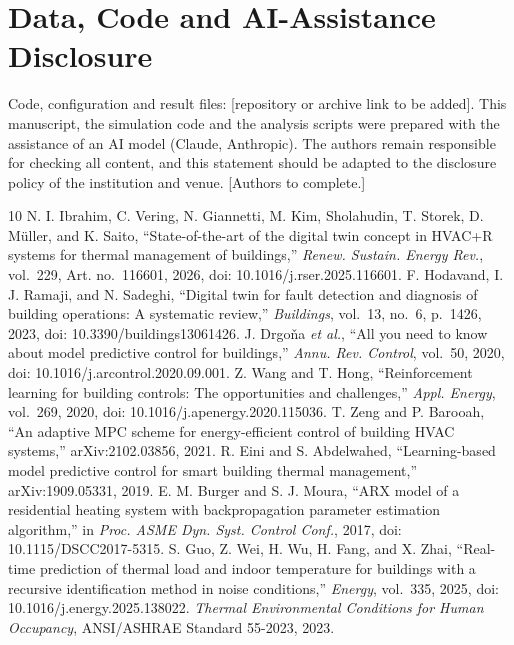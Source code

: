 \documentclass[conference]{IEEEtran}
\begin{document}
\section*{Data, Code and AI-Assistance Disclosure}
Code, configuration and result files: [repository or archive link to be added]. This manuscript, the simulation code and the analysis scripts were prepared with the assistance of an AI model (Claude, Anthropic). The authors remain responsible for checking all content, and this statement should be adapted to the disclosure policy of the institution and venue. [Authors to complete.]

\begin{thebibliography}{10}
 N. I. Ibrahim, C. Vering, N. Giannetti, M. Kim, Sholahudin, T. Storek, D. M\"uller, and K. Saito, ``State-of-the-art of the digital twin concept in HVAC+R systems for thermal management of buildings,'' \emph{Renew. Sustain. Energy Rev.}, vol.~229, Art. no.~116601, 2026, doi: 10.1016/j.rser.2025.116601.
 F. Hodavand, I. J. Ramaji, and N. Sadeghi, ``Digital twin for fault detection and diagnosis of building operations: A systematic review,'' \emph{Buildings}, vol.~13, no.~6, p.~1426, 2023, doi: 10.3390/buildings13061426.
 J. Drgo\v{n}a \emph{et al.}, ``All you need to know about model predictive control for buildings,'' \emph{Annu. Rev. Control}, vol.~50, 2020, doi: 10.1016/j.arcontrol.2020.09.001.
 Z. Wang and T. Hong, ``Reinforcement learning for building controls: The opportunities and challenges,'' \emph{Appl. Energy}, vol.~269, 2020, doi: 10.1016/j.apenergy.2020.115036.
 T. Zeng and P. Barooah, ``An adaptive MPC scheme for energy-efficient control of building HVAC systems,'' arXiv:2102.03856, 2021.
 R. Eini and S. Abdelwahed, ``Learning-based model predictive control for smart building thermal management,'' arXiv:1909.05331, 2019.
 E. M. Burger and S. J. Moura, ``ARX model of a residential heating system with backpropagation parameter estimation algorithm,'' in \emph{Proc. ASME Dyn. Syst. Control Conf.}, 2017, doi: 10.1115/DSCC2017-5315.
 S. Guo, Z. Wei, H. Wu, H. Fang, and X. Zhai, ``Real-time prediction of thermal load and indoor temperature for buildings with a recursive identification method in noise conditions,'' \emph{Energy}, vol.~335, 2025, doi: 10.1016/j.energy.2025.138022.
 \emph{Thermal Environmental Conditions for Human Occupancy}, ANSI/ASHRAE Standard 55-2023, 2023.
\end{thebibliography}
\end{document}
